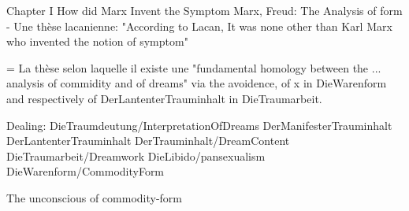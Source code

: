 
Chapter I How did Marx Invent the Symptom
Marx, Freud: The Analysis of form
- Une thèse lacanienne: "According to Lacan, It was none other than Karl Marx who invented the notion of symptom"

= La thèse selon laquelle il existe une "fundamental homology between the ... analysis of commidity and of dreams" via the avoidence, of x in DieWarenform and respectively of DerLantenterTrauminhalt in DieTraumarbeit.

Dealing: DieTraumdeutung/InterpretationOfDreams DerManifesterTrauminhalt DerLantenterTrauminhalt DerTrauminhalt/DreamContent DieTraumarbeit/Dreamwork DieLibido/pansexualism DieWarenform/CommodityForm


The unconscious of commodity-form
